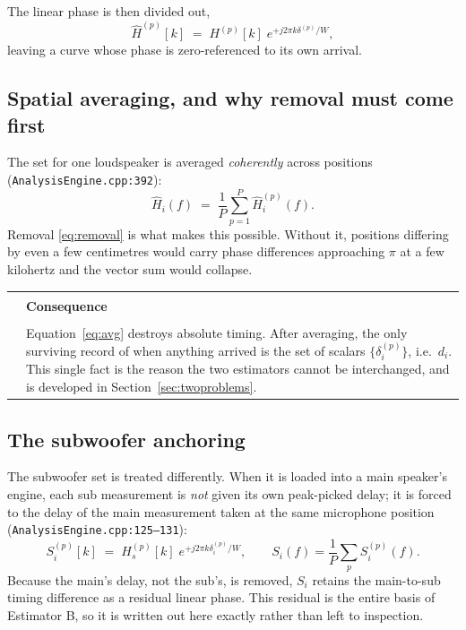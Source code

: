 \documentclass[11pt,a4paper]{article}
\makeatletter
\newcommand{\srcref}[2]{\texttt{\small #1}\discretionary{}{}{}\texttt{\small :#2}}
\newenvironment{remark}[1]
  {\par\medskip\noindent\begin{tabular}{@{}p{0.03\textwidth}p{0.93\textwidth}@{}}
   \textcolor{smtblue}{\rule{2pt}{\baselineskip}} & \textbf{#1}\\[2pt] & \ignorespaces}
  {\end{tabular}\par\medskip}
\makeatother
\begin{document}
The linear phase is then divided out,
%
\begin{equation}
  \hat H^{(p)}[k] \;=\; H^{(p)}[k]\; e^{+j 2\pi k \delta^{(p)} / W},
  \label{eq:removal}
\end{equation}
%
leaving a curve whose phase is zero-referenced to its own arrival.

\subsection{Spatial averaging, and why removal must come first}
\label{sec:averaging}

The set for one loudspeaker is averaged \emph{coherently} across positions
(\srcref{AnalysisEngine.cpp}{392}):
%
\begin{equation}
  \hat H_i(f) \;=\; \frac{1}{P}\sum_{p=1}^{P} \hat H_i^{(p)}(f).
  \label{eq:avg}
\end{equation}
%
Removal \eqref{eq:removal} is what makes this possible. Without it, positions
differing by even a few centimetres would carry phase differences approaching
$\pi$ at a few kilohertz and the vector sum would collapse.

\begin{remark}{Consequence}
Equation~\eqref{eq:avg} destroys absolute timing. After averaging, the only
surviving record of when anything arrived is the set of scalars
$\{\delta_i^{(p)}\}$, i.e.\ $d_i$. This single fact is the reason the two
estimators cannot be interchanged, and is developed in
Section~\ref{sec:twoproblems}.
\end{remark}

\subsection{The subwoofer anchoring}
\label{sec:anchor}

The subwoofer set is treated differently. When it is loaded into a main
speaker's engine, each sub measurement is \emph{not} given its own peak-picked
delay; it is forced to the delay of the main measurement taken at the same
microphone position (\srcref{AnalysisEngine.cpp}{125--131}):
%
\begin{equation}
  S_i^{(p)}[k] \;=\; H_s^{(p)}[k]\; e^{+j 2\pi k \delta_{i}^{(p)} / W},
  \qquad
  S_i(f) = \frac{1}{P}\sum_p S_i^{(p)}(f).
  \label{eq:anchor}
\end{equation}
%
Because the main's delay, not the sub's, is removed, $S_i$ retains the
main-to-sub timing difference as a residual linear phase. This residual is the
entire basis of Estimator B, so it is written out here exactly rather than left
to inspection.
\end{document}
